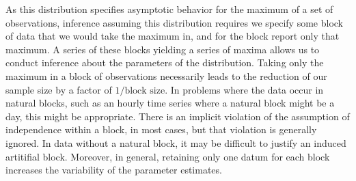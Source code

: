 As this distribution specifies asymptotic behavior for the maximum of a set of observations,
  inference assuming this distribution requires we specify some block of data that we would take the
  maximum in, and for the block report only that maximum.  A series of these blocks yielding a series
  of maxima allows us to conduct inference about the parameters of the distribution.  Taking only the
  maximum in a block of observations necessarily leads to the reduction of our sample size by a factor
  of $1/\text{block size}$. In problems where the data occur in natural blocks, such as an hourly time
  series where a natural block might be a day, this might be appropriate.  There is an implicit
  violation of the assumption of independence within a block, in most cases, but that violation is
  generally ignored. In data without a natural block, it may be difficult to justify an induced
  artitifial block. Moreover, in general, retaining only one datum for each block increases the
  variability of the parameter estimates.


